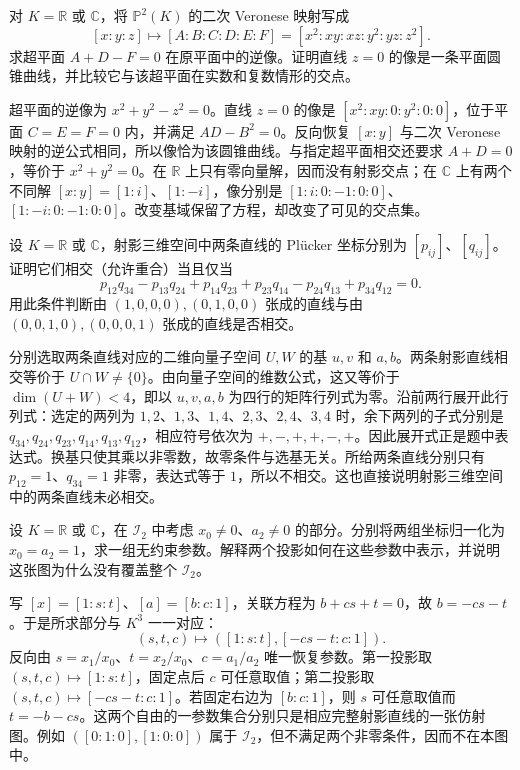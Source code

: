 \begin{exercise}\label{g1:ex:veronese-hyperplane}
	对 \(K=\mathbb R\) 或 \(\mathbb C\)，将 \(\mathbb P^2(K)\) 的二次 Veronese 映射写成
	\[
		[x:y:z]\longmapsto[A:B:C:D:E:F]
		=[x^2:xy:xz:y^2:yz:z^2].
	\]
	求超平面 \(A+D-F=0\) 在原平面中的逆像。证明直线 \(z=0\) 的像是一条平面圆锥曲线，并比较它与该超平面在实数和复数情形的交点。
\end{exercise}
\begin{solution}
	超平面的逆像为 \(x^2+y^2-z^2=0\)。直线 \(z=0\) 的像是 \([x^2:xy:0:y^2:0:0]\)，位于平面 \(C=E=F=0\) 内，并满足 \(AD-B^2=0\)。反向恢复 \([x:y]\) 与二次 Veronese 映射的逆公式相同，所以像恰为该圆锥曲线。与指定超平面相交还要求 \(A+D=0\)，等价于 \(x^2+y^2=0\)。在 \(\mathbb R\) 上只有零向量解，因而没有射影交点；在 \(\mathbb C\) 上有两个不同解 \([x:y]=[1:i]\)、\([1:-i]\)，像分别是 \([1:i:0:-1:0:0]\)、\([1:-i:0:-1:0:0]\)。改变基域保留了方程，却改变了可见的交点集。
\end{solution}

\begin{exercise}\label{g1:ex:plucker-intersection}
	设 \(K=\mathbb R\) 或 \(\mathbb C\)，射影三维空间中两条直线的 Plücker 坐标分别为 \([p_{ij}]\)、\([q_{ij}]\)。证明它们相交（允许重合）当且仅当
	\[
		p_{12}q_{34}-p_{13}q_{24}+p_{14}q_{23}
		+p_{23}q_{14}-p_{24}q_{13}+p_{34}q_{12}=0.
	\]
	用此条件判断由 \((1,0,0,0),(0,1,0,0)\) 张成的直线与由 \((0,0,1,0),(0,0,0,1)\) 张成的直线是否相交。
\end{exercise}
\begin{solution}
	分别选取两条直线对应的二维向量子空间 \(U,W\) 的基 \(u,v\) 和 \(a,b\)。两条射影直线相交等价于 \(U\cap W\ne\{0\}\)。由向量子空间的维数公式，这又等价于 \(\dim(U+W)<4\)，即以 \(u,v,a,b\) 为四行的矩阵行列式为零。沿前两行展开此行列式：选定的两列为 \(1,2\)、\(1,3\)、\(1,4\)、\(2,3\)、\(2,4\)、\(3,4\) 时，余下两列的子式分别是 \(q_{34},q_{24},q_{23},q_{14},q_{13},q_{12}\)，相应符号依次为 \(+,-,+,+,-,+\)。因此展开式正是题中表达式。换基只使其乘以非零数，故零条件与选基无关。所给两条直线分别只有 \(p_{12}=1\)、\(q_{34}=1\) 非零，表达式等于 \(1\)，所以不相交。这也直接说明射影三维空间中的两条直线未必相交。
\end{solution}

\begin{exercise}\label{g1:ex:incidence-chart}
	设 \(K=\mathbb R\) 或 \(\mathbb C\)，在 \(\mathcal I_2\) 中考虑 \(x_0\ne0\)、\(a_2\ne0\) 的部分。分别将两组坐标归一化为 \(x_0=a_2=1\)，求一组无约束参数。解释两个投影如何在这些参数中表示，并说明这张图为什么没有覆盖整个 \(\mathcal I_2\)。
\end{exercise}
\begin{solution}
	写 \([x]=[1:s:t]\)、\([a]=[b:c:1]\)，关联方程为 \(b+cs+t=0\)，故 \(b=-cs-t\)。于是所求部分与 \(K^3\) 一一对应：
	\[
		(s,t,c)\longmapsto([1:s:t],[-cs-t:c:1]).
	\]
	反向由 \(s=x_1/x_0\)、\(t=x_2/x_0\)、\(c=a_1/a_2\) 唯一恢复参数。第一投影取 \((s,t,c)\mapsto[1:s:t]\)，固定点后 \(c\) 可任意取值；第二投影取 \((s,t,c)\mapsto[-cs-t:c:1]\)。若固定右边为 \([b:c:1]\)，则 \(s\) 可任意取值而 \(t=-b-cs\)。这两个自由的一参数集合分别只是相应完整射影直线的一张仿射图。例如 \(([0:1:0],[1:0:0])\) 属于 \(\mathcal I_2\)，但不满足两个非零条件，因而不在本图中。
\end{solution}
